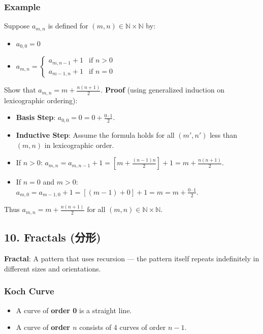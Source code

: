 \documentclass[10pt,a4paper,openany]{ctexbook}
\theoremstyle{definition}
\theoremstyle{remark}
\begin{document}
\subsubsection{Example}

Suppose $a_{m,n}$ is defined for $(m, n) \in \mathbb{N} \times \mathbb{N}$ by:
\begin{itemize}
\item $a_{0,0} = 0$
\item $a_{m,n} = \begin{cases} a_{m,n-1} + 1 & \text{if } n > 0 \\ a_{m-1,n} + 1 & \text{if } n = 0 \end{cases}$

\end{itemize}

Show that $a_{m,n} = m + \frac{n(n+1)}{2}$.
\textbf{Proof} (using generalized induction on lexicographic ordering):
\begin{itemize}
\item \textbf{Basis Step}: $a_{0,0} = 0 = 0 + \frac{0 \cdot 1}{2}$.
\item \textbf{Inductive Step}: Assume the formula holds for all $(m', n')$ less than $(m, n)$ in lexicographic order.
\item If $n > 0$: $a_{m,n} = a_{m,n-1} + 1 = [m + \frac{(n-1)n}{2}] + 1 = m + \frac{n(n+1)}{2}$.
\item If $n = 0$ and $m > 0$: $a_{m,0} = a_{m-1,0} + 1 = [(m-1) + 0] + 1 = m = m + \frac{0 \cdot 1}{2}$.

\end{itemize}

Thus $a_{m,n} = m + \frac{n(n+1)}{2}$ for all $(m,n) \in \mathbb{N} \times \mathbb{N}$.
\vspace{-2pt}

\subsection{10. Fractals (分形)}

\textbf{Fractal}: A pattern that uses recursion — the pattern itself repeats indefinitely in different sizes and orientations.
\subsubsection{Koch Curve}

\begin{itemize}
\item A curve of \textbf{order 0} is a straight line.
\item A curve of \textbf{order $n$} consists of 4 curves of order $n-1$.

\end{itemize}
\end{document}
